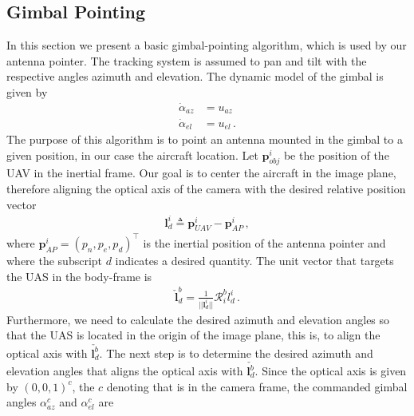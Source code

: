\subsection{Gimbal Pointing}{\label{sub:gimbal_pointing}}
In this section we present a basic gimbal-pointing algorithm, which is used by our antenna pointer. The tracking system is assumed to pan and tilt with the respective angles azimuth and elevation. The dynamic model of the gimbal is given by
\begin{align*}
\dot{\alpha}_{az}&=u_{az} \\
\dot{\alpha}_{el}&=u_{el}\,.
\end{align*}
The purpose of this algorithm is to point an antenna mounted in the gimbal to a given position, in our case the aircraft location. Let $\boldsymbol{p}_{obj}^i$ be the position of the UAV in the inertial frame. Our goal is to center the aircraft in the image plane, therefore aligning the optical axis of the camera with the desired relative position vector
\begin{align*}
\boldsymbol{l}_{d}^i\triangleq \boldsymbol{p}_{UAV}^i-\boldsymbol{p}_{AP}^i\,,
\end{align*}
where $\boldsymbol{p}_{AP}^i = (p_n,p_e,p_d)^\top$ is the inertial position of the antenna pointer and where the subscript $d$ indicates a desired quantity. The unit vector that targets the UAS in the body-frame is
\begin{align*}
\check{\boldsymbol{l}}_d^b=\frac{1}{\lvert\lvert \boldsymbol{l}_d^i\rvert\rvert}\mathcal{R}_i^bl_d^i\,.
\end{align*}
Furthermore, we need to calculate the desired azimuth and elevation angles so that the UAS is located in the origin of the image plane, this is, to align the optical axis with $\check{\boldsymbol{l}_d^b}$.
The next step is to determine the desired azimuth and elevation angles that aligns the optical axis with $\check{\boldsymbol{l}_d^b}$. Since the optical axis is given by $(0,0,1)^c$, the $c$ denoting that is in the camera frame, the commanded gimbal angles $\alpha_{az}^c$ and $\alpha_{el}^c$ are
